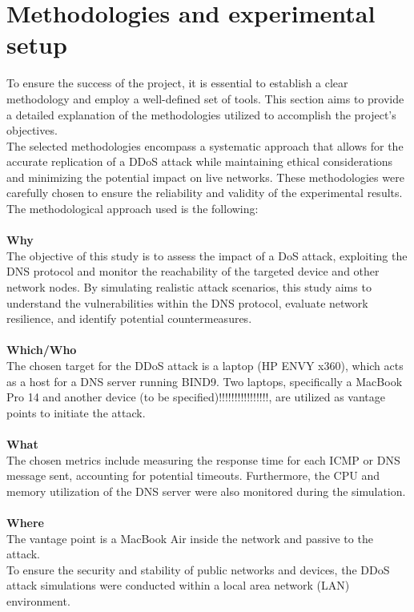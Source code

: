 \section{Methodologies and experimental setup}

To ensure the success of the project, it is essential to establish a clear methodology and employ a well-defined set of tools.
This section aims to provide a detailed explanation of the methodologies utilized to accomplish the project's objectives.\\
The selected methodologies encompass a systematic approach that allows for the accurate replication of a
DDoS attack while maintaining ethical considerations and minimizing the potential impact on live networks.
These methodologies were carefully chosen to ensure the reliability and validity of the experimental results.
The methodological approach used is the following:\\
\\
\textbf{Why}\\
The objective of this study is to assess the impact of a DoS attack, exploiting the DNS protocol and monitor the reachability
of the targeted device and other network nodes.
By simulating realistic attack scenarios, this study aims to understand the vulnerabilities within the DNS protocol, evaluate network resilience,
and identify potential countermeasures.\\
\\
\textbf{Which/Who}\\
The chosen target for the DDoS attack is a laptop (HP ENVY x360), which acts as a host for a DNS server running BIND9.
Two laptops, specifically a MacBook Pro 14 and another device (to be specified)!!!!!!!!!!!!!!!!, are utilized as vantage points to initiate the attack.\\
\\
\textbf{What}\\
The chosen metrics include measuring the response time for each ICMP or DNS message sent, accounting for potential timeouts.
Furthermore, the CPU and memory utilization of the DNS server were also monitored during the simulation. \\
\\
\textbf{Where}\\
The vantage point is a MacBook Air inside the
network and passive to the attack.\\
To ensure the security and stability of public networks and devices,
the DDoS attack simulations were conducted within a local area network (LAN) environment.

